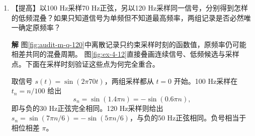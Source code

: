 \documentclass[11pt,openany,fontset=fandol]{ctexbook}
\theoremstyle{plain}\newtheorem{theorem}{定理}[chapter]\newtheorem{proposition}[theorem]{命题}
\theoremstyle{definition}\newtheorem{definition}{定义}[chapter]\newtheorem{example}{例}[chapter]
\theoremstyle{remark}\newtheorem*{remark}{说明}
\newcommand{\SolutionStart}{\par\nobreak\medskip\nobreak\noindent\textbf{解}\quad\ignorespaces}
\newenvironment{solution}{\SolutionStart}{\par\medskip}
\newcommand{\dd}{\mathop{}\!\mathrm d}\newcommand{\ii}{\mathrm i}\newcommand{\ee}{\mathrm e}
\newcommand{\vct}[1]{\bm{#1}}\newcommand{\Rea}{\operatorname{Re}}\newcommand{\Ima}{\operatorname{Im}}
\begin{document}
\begin{enumerate}[label=4.\arabic*,itemsep=3pt]
\begin{solution}
\begin{figure}[H]\centering
{}
\caption{题4.11解图：中途运动点的速度沿切线、支持力沿法线。直角微元给出 $\dd s^2=(1+x^2/R^2)\dd x^2$，直接进入动能和周期积分。微元作放大示意。}\label{fig:ex-4-11}
\end{figure}

轨道静止且光滑，支持力沿法向、速度沿切向，逐时功率 $\vct N\cdot\vct v=0$。它可以改变速度方向而不改变机械能。题2.16的杆在转动，约束点的运动可使真实速度含沿支持力的分量，两种情形的做功条件不同。

图中支持力与中途速度垂直，所以没有支持力功；被积式的几何根号则来自同一条斜切线的路程。
\end{solution}

\item \begin{minipage}[t]{\linewidth}
【提高】以100 Hz采样70 Hz正弦，另以120 Hz采样同一信号，分别得到怎样的低频混叠？如果只知道信号为单频但不知道最高频率，两组记录是否必然唯一确定原频率？

\end{minipage}

\begin{solution}
图\ref{fig:audit-m-q-120}中离散记录只约束采样时刻的函数值，原频率仍可能相差共同的混叠周期。
图\ref{fig:ex-4-12}直接叠画连续信号、低频候选与采样点。下面在采样时刻验证这些点为何完全重合。

取信号 $s(t)=\sin(2\pi70t)$，两组采样都从 $t=0$ 开始。100 Hz采样在 $t_n=n/100$ 给出
\[
s_n=\sin(1.4\pi n)
=-\sin(0.6\pi n),
\]
即与负的30 Hz正弦完全相同。120 Hz采样则给出 $s_n=\sin(7\pi n/6)=-\sin(5\pi n/6)$，与负的50 Hz正弦相同。负号相当于相位相差 $\pi$。


\end{solution}
\end{enumerate}
\end{document}
